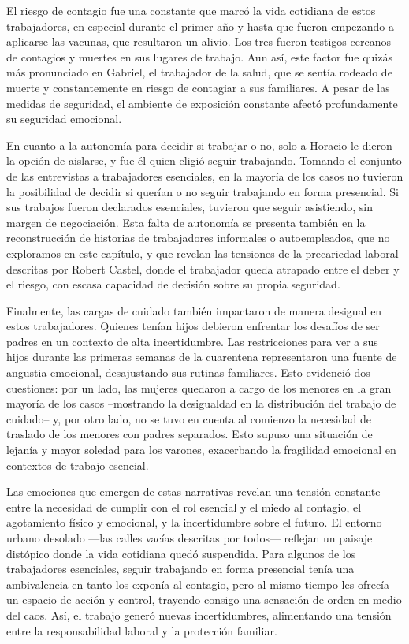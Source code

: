 \begin{refsection}
El riesgo de contagio fue una constante que marcó la vida cotidiana de estos trabajadores, en especial durante el primer año y hasta que fueron empezando a aplicarse las vacunas, que resultaron un alivio. Los tres fueron testigos cercanos de contagios y muertes en sus lugares de trabajo. Aun así, este factor fue quizás más pronunciado en Gabriel, el trabajador de la salud, que se sentía rodeado de muerte y constantemente en riesgo de contagiar a sus familiares. A pesar de las medidas de seguridad, el ambiente de exposición constante afectó profundamente su seguridad emocional.

En cuanto a la autonomía para decidir si trabajar o no, solo a Horacio le dieron la opción de aislarse, y fue él quien eligió seguir trabajando. Tomando el conjunto de las entrevistas a trabajadores esenciales, en la mayoría de los casos no tuvieron la posibilidad de decidir si querían o no seguir trabajando en forma presencial. Si sus trabajos fueron declarados esenciales, tuvieron que seguir asistiendo, sin margen de negociación. Esta falta de autonomía se presenta también en la reconstrucción de historias de trabajadores informales o autoempleados, que no exploramos en este capítulo, y que revelan las tensiones de la precariedad laboral descritas por Robert Castel, donde el trabajador queda atrapado entre el deber y el riesgo, con escasa capacidad de decisión sobre su propia seguridad.

Finalmente, las cargas de cuidado también impactaron de manera desigual en estos trabajadores. Quienes tenían hijos debieron enfrentar los desafíos de ser padres en un contexto de alta incertidumbre. Las restricciones para ver a sus hijos durante las primeras semanas de la cuarentena representaron una fuente de angustia emocional, desajustando sus rutinas familiares. Esto evidenció dos cuestiones: por un lado, las mujeres quedaron a cargo de los menores en la gran mayoría de los casos –mostrando la desigualdad en la distribución del trabajo de cuidado– y, por otro lado, no se tuvo en cuenta al comienzo la necesidad de traslado de los menores con padres separados. Esto supuso una situación de lejanía y mayor soledad para los varones, exacerbando la fragilidad emocional en contextos de trabajo esencial.

Las emociones que emergen de estas narrativas revelan una tensión constante entre la necesidad de cumplir con el rol esencial y el miedo al contagio, el agotamiento físico y emocional, y la incertidumbre sobre el futuro. El entorno urbano desolado —las calles vacías descritas por todos— reflejan un paisaje distópico donde la vida cotidiana quedó suspendida. Para algunos de los trabajadores esenciales, seguir trabajando en forma presencial tenía una ambivalencia en tanto los exponía al contagio, pero al mismo tiempo les ofrecía un espacio de acción y control, trayendo consigo una sensación de orden en medio del caos. Así, el trabajo generó nuevas incertidumbres, alimentando una tensión entre la responsabilidad laboral y la protección familiar.


\end{refsection}
